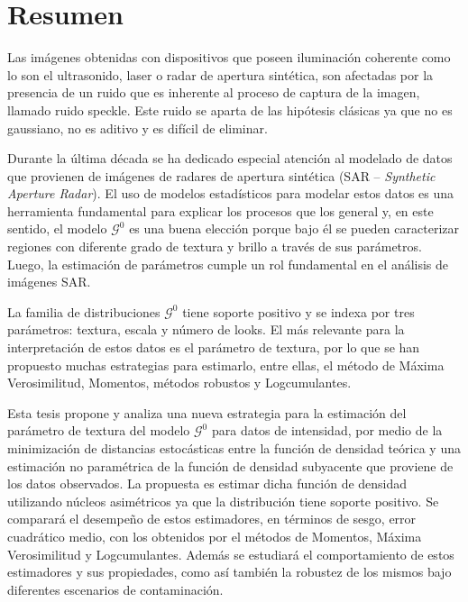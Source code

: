 \newpage
$\ $
\thispagestyle{empty} %


\chapter{Resumen}

Las imágenes obtenidas con dispositivos que poseen iluminación coherente como lo son el ultrasonido, laser o radar de apertura sintética, son afectadas por la presencia de un ruido que es inherente al proceso de captura de la imagen, llamado ruido speckle. Este ruido se aparta de las hipótesis clásicas ya que no es gaussiano, no es aditivo y es difícil de eliminar. 

Durante la última década se ha dedicado especial atención al modelado de datos que provienen de imágenes de radares de apertura sintética (SAR -- \textit{Synthetic Aperture Radar}). 
El uso de modelos estadísticos para modelar estos datos es una herramienta fundamental para explicar los procesos que los general y, en este sentido, el modelo $\mathcal{G}^0$ es una buena elección porque bajo él se pueden caracterizar regiones con diferente grado de textura y brillo a través de sus parámetros. Luego, la estimación de parámetros cumple un rol fundamental en el análisis de imágenes SAR.  

La familia de distribuciones $\mathcal{G}^0$ tiene soporte positivo y se indexa por tres parámetros: textura, escala y número de looks. %
El más relevante para la interpretación de estos datos es el parámetro de textura, por lo que se han propuesto muchas estrategias para estimarlo, entre ellas, el método de Máxima Verosimilitud, Momentos, métodos robustos y Logcumulantes.

Esta tesis propone y analiza una nueva estrategia para la estimación del parámetro de textura del modelo $\mathcal G^0$ para datos de intensidad, por medio de la minimización de distancias estocásticas entre la función de densidad teórica y una estimación no paramétrica de la función de densidad subyacente que proviene de los datos observados. La propuesta es estimar dicha función de densidad utilizando núcleos asimétricos ya que la distribución tiene soporte positivo. Se comparará el desempeño de estos estimadores, en términos de sesgo, error cuadrático medio, con los obtenidos por el métodos de Momentos, Máxima Verosimilitud y Logcumulantes. Además se estudiará el comportamiento de estos estimadores y sus propiedades, como así también la robustez de los mismos bajo diferentes escenarios de contaminación.